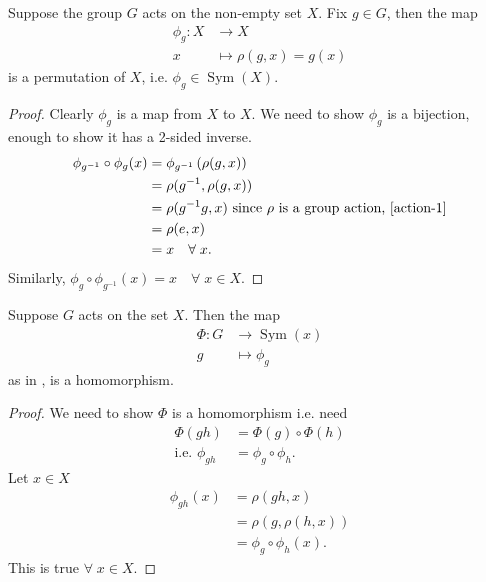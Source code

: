 \begin{lemma} \label{lem:16}
    Suppose the group $G$ acts on the non-empty set $X$.
    Fix $g \in G$, then the map
    \begin{align*}
        \phi_g : X &\to X \\
        x &\mapsto \rho(g, x) = g(x)
    \end{align*} is a permutation of $X$, i.e. $\phi_g \in \operatorname{Sym}(X)$.
\end{lemma} 

\begin{proof}
    Clearly $\phi_g$ is a map from $X$ to $X$.
    We need to show $\phi_g$ is a bijection, enough to show it has a 2-sided inverse.
    \begin{align*}
        \phi_{g^{-1}} \circ \phi_g (x) &= \phi_{g^{-1}} \left( \rho (g, x) \right) \\
        &= \rho(g^{-1}, \rho(g, x)) \\
        &= \rho(g^{-1} g, x) \text{ since $\rho$ is a group action, \Cref{action-1}} \\
        &= \rho(e, x) \\
        &= x \quad \forall \; x.
    \end{align*} 
    Similarly, $\phi_g \circ \phi_{g^{-1}}(x) = x \quad \forall \; x \in X$.
\end{proof} 

\begin{proposition} \label{prp:6}
    Suppose $G$ acts on the set $X$.
    Then the map 
    \begin{align*}
        \Phi : G &\to \operatorname{Sym}(x) \\
        g &\mapsto \phi_g
    \end{align*} as in , is a homomorphism.
\end{proposition}  

\begin{proof}
    We need to show $\Phi$ is a homomorphism i.e. need
    \begin{align*}
        \Phi(gh) &= \Phi(g) \circ \Phi(h) \\
        \text{i.e. } \phi_{gh} &= \phi_g \circ \phi_h.
    \end{align*}  
    Let $x \in X$
    \begin{align*}
        \phi_{gh}(x) &= \rho(gh, x) \\
        &= \rho(g, \rho(h, x)) \\
        &= \phi_g \circ \phi_h (x).
    \end{align*} 
    This is true $\forall \; x \in X$.
\end{proof} 

